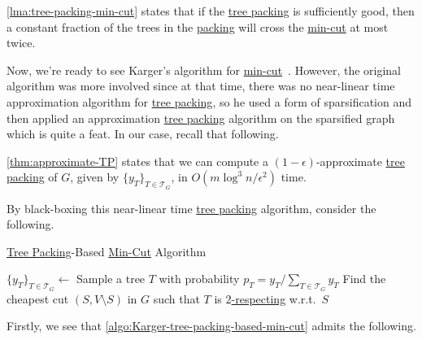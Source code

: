 \begin{remark}
	\autoref{lma:tree-packing-min-cut} states that if the \hyperref[prb:TP]{tree packing} is sufficiently good, then a constant fraction of the trees in the \hyperref[prb:TP]{packing} will cross the \hyperref[prb:global-min-cut]{min-cut} at most twice.
\end{remark}

Now, we're ready to see Karger's algorithm for \hyperref[prb:global-min-cut]{min-cut}~\cite{karger2000minimum}. However, the original algorithm was more involved since at that time, there was no near-linear time approximation algorithm for \hyperref[prb:TP]{tree packing}, so he used a form of sparsification and then applied an approximation \hyperref[prb:TP]{tree packing} algorithm on the sparsified graph which is quite a feat. In our case, recall that following.

\begin{prev}
	\autoref{thm:approximate-TP} states that we can compute a \((1 - \epsilon )\)-approximate \hyperref[prb:TP]{tree packing} of \(G\), given by \(\{ y_T \} _{T \in \mathcal{T} _G}\), in \(O(m \log ^3 n / \epsilon ^2)\) time.
\end{prev}

By black-boxing this near-linear time \hyperref[prb:TP]{tree packing} algorithm, consider the following.

\begin{algorithm}[H]\label{algo:Karger-tree-packing-based-min-cut}
	\DontPrintSemicolon{}
	\caption{\hyperref[prb:TP]{Tree Packing}-Based \hyperref[prb:global-min-cut]{Min-Cut} Algorithm~\cite{karger2000minimum,chekuri2017near}}
	\BlankLine

	\(\{ y_T \} _{T \in \mathcal{T} _G} \gets\)\label{algo:Karger-tree-packing-based-min-cut-TP}
	Sample a tree \(T\) with probability \(p_T = y_T / \sum_{T \in \mathcal{T} _G} y_T\)\label{algo:Karger-tree-packing-based-min-cut-sample}\;
	Find the cheapest cut \((S, V\setminus S)\) in \(G\) such that \(T\) is \hyperref[def:respect]{\(2\)-respecting} w.r.t.\ \(S\)\label{algo:Karger-tree-packing-based-min-cut-find-respect-cut}\;
	\;
\end{algorithm}

Firstly, we see that \autoref{algo:Karger-tree-packing-based-min-cut} admits the following.

